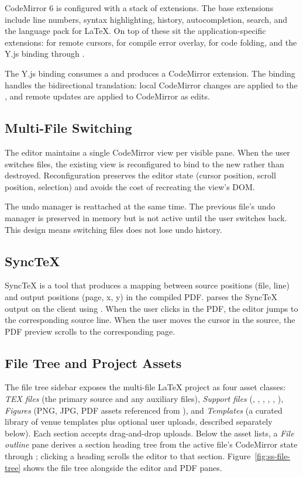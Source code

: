 CodeMirror 6 is configured with a stack of extensions. The base extensions include line numbers, syntax highlighting, history, autocompletion, search, and the language pack for LaTeX. On top of these sit the application-specific extensions:  for remote cursors,  for compile error overlay,  for code folding, and the Y.js binding through .

The Y.js binding consumes a  and produces a CodeMirror extension. The binding handles the bidirectional translation: local CodeMirror changes are applied to the , and remote  updates are applied to CodeMirror as edits.

\subsection{Multi-File Switching}

The editor maintains a single CodeMirror view per visible pane. When the user switches files, the existing view is reconfigured to bind to the new  rather than destroyed. Reconfiguration preserves the editor state (cursor position, scroll position, selection) and avoids the cost of recreating the view's DOM.

The undo manager is reattached at the same time. The previous file's undo manager is preserved in memory but is not active until the user switches back. This design means switching files does not lose undo history.

\subsection{SyncTeX}

SyncTeX is a tool that produces a mapping between source positions (file, line) and output positions (page, x, y) in the compiled PDF. \sh{} parses the SyncTeX output on the client using . When the user clicks in the PDF, the editor jumps to the corresponding source line. When the user moves the cursor in the source, the PDF preview scrolls to the corresponding page.

\subsection{File Tree and Project Assets}

The file tree sidebar exposes the multi-file LaTeX project as four asset classes: \emph{TEX files} (the primary source and any auxiliary  files), \emph{Support files} (, , , , , ), \emph{Figures} (PNG, JPG, PDF assets referenced from ), and \emph{Templates} (a curated library of venue templates plus optional user uploads, described separately below). Each section accepts drag-and-drop uploads. Below the asset lists, a \emph{File outline} pane derives a section heading tree from the active file's CodeMirror state through ; clicking a heading scrolls the editor to that section. Figure~\ref{fig:ss-file-tree} shows the file tree alongside the editor and PDF panes.

